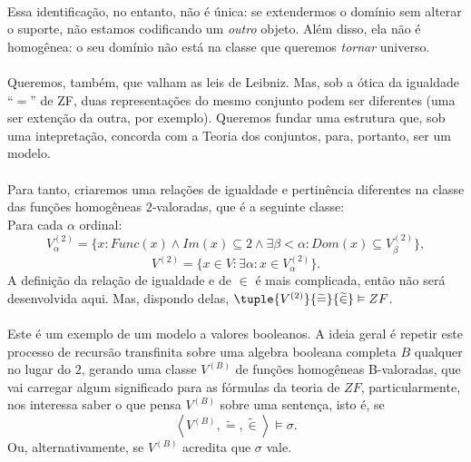 \documentclass[12pt]{article}
\begin{document}
        \paragraph{}
            Essa identificação, no entanto, não é única: se extendermos 
            o domínio sem alterar o suporte, não estamos codificando um {\em outro} objeto. 
            Além disso, ela não é homogênea: o seu domínio não está na classe que queremos 
            {\em tornar} universo.
        \paragraph{}
            Queremos, também, que valham as leis de Leibniz.
            Mas, sob a ótica da igualdade ``$=$'' de {\sc ZF}, duas 
            representações do mesmo conjunto podem ser diferentes 
            (uma ser extenção da outra, por exemplo). Queremos fundar uma estrutura 
            que, sob uma intepretação, concorda com a Teoria dos 
            conjuntos, para, portanto, ser um modelo.
        \paragraph{}
            Para tanto, criaremos uma relações de igualdade e pertinência 
            diferentes na classe das funções homogêneas $2$-valoradas, que 
            é a seguinte classe:\\
        Para cada $\alpha$ ordinal:
            $$V^{(2)}_\alpha=\{x:Func(x)\land Im(x)\subseteq 2\land\exists\beta<\alpha:Dom(x)\subseteq V^{(2)}_{\beta}\},$$
            $$V^{(2)}=\{x\in V:\exists\alpha: x\in V^{(2)}_\alpha\}.$$
        A definição da relação de igualdade e de ${}\in{}$ é mais complicada, então não será desenvolvida aqui. Mas, dispondo delas,
        $\tuple{V^{(2)}}{\widetilde=}{\widetilde\in}\vDash{\sc ZF}$.
        \paragraph{}
            Este é um exemplo de um modelo a valores booleanos. A ideia geral é repetir 
            este processo de recursão transfinita sobre uma algebra booleana completa 
            $B$ qualquer no lugar do $2$, gerando uma classe $V^{(B)}$ de funções 
            homogêneas B-valoradas, que vai carregar algum significado para as 
            fórmulas da teoria de $ZF$, particularmente, nos interessa saber 
            o que pensa $V^{(B)}$ sobre uma sentença, isto é, se 
            $$\left\langle V^{(B)},\widetilde=,\widetilde\in\right\rangle\vDash\sigma.$$
            Ou, alternativamente, se $V^{(B)}$ acredita que $\sigma$ vale.
\end{document}
